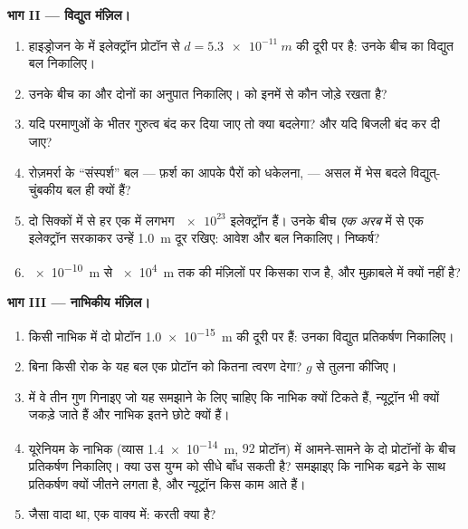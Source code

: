 \begin{problem}
\medskip
\noindent\textbf{भाग II --- विद्युत मंज़िल।}
\begin{enumerate}[resume]
  \item हाइड्रोजन के  में इलेक्ट्रॉन प्रोटॉन से $d = \qty{5.3e-11}{m}$ की
        दूरी पर है: उनके बीच का विद्युत बल निकालिए।
  \item उनके बीच का  और दोनों का अनुपात निकालिए।
         को इनमें से कौन जोड़े रखता है?
  \item यदि परमाणुओं के भीतर गुरुत्व बंद कर दिया जाए तो क्या बदलेगा?
        और यदि बिजली बंद कर दी जाए?
  \item रोज़मर्रा के ``संस्पर्श'' बल --- फ़र्श का आपके पैरों को
        धकेलना,  --- असल में भेस बदले विद्युत्-चुंबकीय बल ही
        क्यों हैं?
  \item दो सिक्कों में से हर एक में लगभग $\num{e23}$ इलेक्ट्रॉन हैं। उनके बीच
        \emph{एक अरब} में से एक इलेक्ट्रॉन सरकाकर उन्हें \qty{1.0}{m} दूर रखिए:
        आवेश और बल निकालिए। निष्कर्ष?
  \item \qty{e-10}{m} से \qty{e4}{m} तक की मंज़िलों पर किसका राज है, और
         मुक़ाबले में क्यों नहीं है?
\end{enumerate}

\medskip
\noindent\textbf{भाग III --- नाभिकीय मंज़िल।}
\begin{enumerate}[resume]
  \item किसी नाभिक में दो प्रोटॉन \qty{1.0e-15}{m} की दूरी पर हैं: उनका
        विद्युत प्रतिकर्षण निकालिए।
  \item बिना किसी रोक के यह बल एक प्रोटॉन को कितना त्वरण देगा?
        $g$ से तुलना कीजिए।
  \item {} में वे तीन गुण गिनाइए जो यह समझाने के लिए
        चाहिए कि नाभिक क्यों टिकते हैं, न्यूट्रॉन भी क्यों जकड़े जाते हैं और
        नाभिक इतने छोटे क्यों हैं।
  \item यूरेनियम के नाभिक (व्यास \qty{1.4e-14}{m}, $92$ प्रोटॉन) में
        आमने-सामने के दो प्रोटॉनों के बीच प्रतिकर्षण निकालिए। क्या
         उस युग्म को सीधे बाँध सकती है? समझाइए कि
        नाभिक बढ़ने के साथ प्रतिकर्षण क्यों जीतने लगता है, और न्यूट्रॉन किस
        काम आते हैं।
  \item जैसा वादा था, एक वाक्य में:  करती क्या है?
\end{enumerate}


\end{problem}
